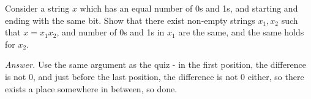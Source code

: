 \documentclass[a4paper]{article}
\newenvironment{ans}{\begin{breakbox}\textit{Answer.}}{\end{breakbox}}
\begin{document}
\begin{ques}
    Consider a string $x$ which has an equal number of 0s and 1s, and starting and ending with the same bit. Show that there exist non-empty strings $x_1, x_2$ such that $x = x_1x_2$, and number of 0s
    and 1s in $x_1$ are the same, and the same holds for $x_2$.
\end{ques}

\begin{ans}
    Use the same argument as the quiz - in the first position, the difference is not 0, and just before the last position, the difference is not 0 either, so there exists a place somewhere in
    between, so done.
\end{ans}
\end{document}
